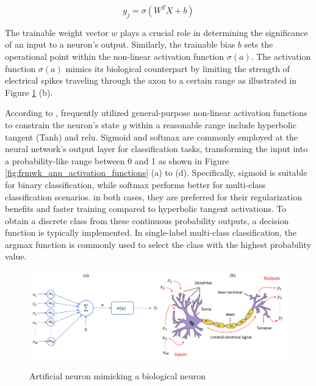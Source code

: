 \begin{equation}
    \label{eq:ann_activation_outpu}
    y_j = \sigma  \left( W^TX +b \right)
\end{equation}

The trainable weight vector $w$ plays a crucial role in determining the significance of an input to a neuron's output. Similarly, the trainable bias $b$ sets the operational point within the non-linear activation function $\sigma(a)$. The activation function $\sigma(a)$ mimics its biological counterpart by limiting the strength of electrical spikes traveling through the axon to a certain range as illustrated in Figure \ref{fig:frmwk_ann_artificial_neuron} (b).

According to \textcite{Bishop2023}, frequently utilized general-purpose non-linear activation functions to constrain the neuron's state $y$ within a reasonable range include hyperbolic tangent (Tanh) and \gls{relu}. Sigmoid and softmax are commonly employed at the neural network's output layer for classification tasks, transforming the input into a probability-like range between 0 and 1 as shown in Figure \ref{fig:frmwk_ann_activation_functions} (a) to (d). Specifically, sigmoid is suitable for binary classification, while softmax performs better for multi-class classification scenarios. in both cases, they are preferred for their regularization benefits and faster training compared to hyperbolic tangent activations. To obtain a discrete class from these continuous probability outputs, a decision function is typically implemented. In single-label multi-class classification, the argmax function is commonly used to select the class with the highest probability value. 

\begin{figure}[htbp]
    \raggedright
        \caption{Artificial neuron mimicking a biological neuron}
        \includegraphics[width=1\textwidth]{resources/images/030-theoretical_framework/Framework_ann_neuron.png}
        \label{fig:frmwk_ann_artificial_neuron}
\end{figure}

